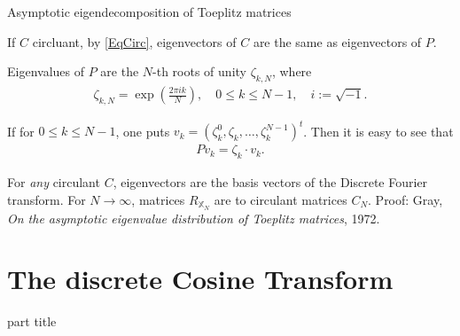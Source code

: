 \begin{frame}{Asymptotic eigendecomposition of Toeplitz matrices}
\bit
\item If $C$ circluant, by \eqref{EqCirc}, eigenvectors of $C$ are the same as eigenvectors of $P$. 
\item Eigenvalues of $P$ are the $N$-th roots of unity $\zeta_{k,N}$, where
\begin{align*}
\zeta_{k,N}=\exp\left(\frac{2\pi ik}{N}\right), \quad 0\leq k\leq N-1,\quad i:=\sqrt{-1}.
\end{align*}
\item If for $0\leq k\leq N-1$, one puts $v_k=(\zeta_k^0,\zeta_k,\dots,\zeta_k^{N-1})^t$. Then it is easy to see that
\begin{align*}
Pv_k=\zeta_k\cdot v_k.
\end{align*}
\item[\iarrow] For \textit{any} circulant $C$, eigenvectors are the basis vectors of the Discrete Fourier transform. 
\eit
For $N\to\infty$, matrices $R_{\mathbb{X}_N}$ are  to circulant matrices $C_N$. 
Proof: Gray, \textit{On the asymptotic eigenvalue distribution of Toeplitz matrices}, 1972.

\end{frame}





\section{The discrete Cosine Transform}
\begin{frame}
 \vspace{12.0ex}
\begin{center}
\begin{beamercolorbox}[sep=12pt,center]{part title}
\insertsection\par
\end{beamercolorbox}
\end{center}
\end{frame}


